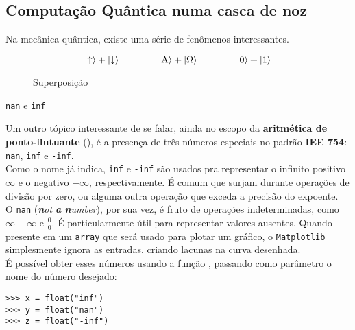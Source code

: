 \documentclass[12pt]{article}
\begin{document}
	
	\subsection*{Computação Quântica numa casca de noz}
	
	Na mecânica quântica, existe uma série de fenômenos interessantes.
	
	\begin{figure}[H]
		\centering\Large
		$$ \left|\uparrow\right\rangle  +  \left|\downarrow\right\rangle  \hspace{40pt}  \left|\text{A}\right\rangle  +  \left|\Omega\right\rangle  \hspace{40pt}  \left|0\right\rangle  +  \left|1\right\rangle $$
	\caption{Superposição}
	\end{figure}
	
	
	
	\begin{interlude}{\texttt{nan} e \texttt{inf}}
	
	Um outro tópico interessante de se falar, ainda no escopo da \textbf{aritmética de ponto-flutuante} (), é a presença de três números especiais no padrão \textbf{IEE 754}: \texttt{nan}, \texttt{inf} e \texttt{-inf}.\\
	
	Como o nome já indica, \texttt{inf} e \texttt{-inf} são usados pra representar o infinito positivo $\infty$ e o negativo $-\infty$, respectivamente. É comum que surjam durante operações de divisão por zero, ou alguma outra operação que exceda a precisão do expoente.\\
	
	O \texttt{nan} (\textit{\textbf{n}ot \textbf{a} \textbf{n}umber}), por sua vez, é fruto de operações indeterminadas, como $\infty - \infty$ e $\frac{0}{0}$. É particularmente útil para representar valores ausentes. Quando presente em um \texttt{array} que será usado para plotar um gráfico, o \texttt{Matplotlib} simplesmente ignora as entradas, criando lacunas na curva desenhada.\\
	
	É possível obter esses números usando a função , passando como parâmetro o nome do número desejado:
	
	\begin{lstlisting}[caption='\texttt{nan} e \texttt{inf}']
>>> x = float("inf")
>>> y = float("nan")
>>> z = float("-inf")
	\end{lstlisting}
	
	\end{interlude}
	
\end{document}
